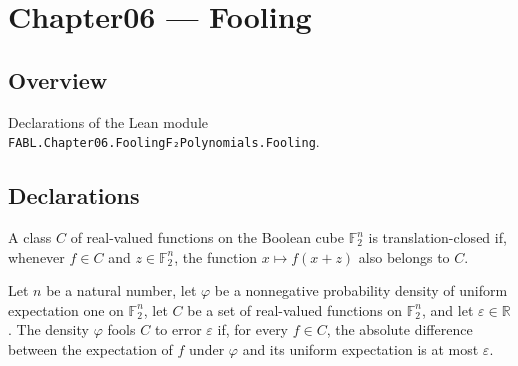 \chapter{Chapter06 — Fooling}
\section{Overview}

Declarations of the Lean module \texttt{FABL.Chapter06.FoolingF₂Polynomials.Fooling}.

\section{Declarations}

\begin{definition}
\label{FABL.IsTranslationClosed}
\leanok
A class $C$ of real-valued functions on the Boolean cube $\mathbb{F}_2^n$ is translation-closed if,
whenever $f \in C$ and $z \in \mathbb{F}_2^n$, the function $x \mapsto f(x+z)$ also belongs to $C$.
\end{definition}

\begin{definition}
\label{FABL.ProbabilityDensity.Fools}
\leanok
{}
Let $n$ be a natural number, let $\varphi$ be a nonnegative probability density of
uniform expectation one on $\mathbb{F}_2^n$, let $C$ be a set of real-valued functions
on $\mathbb{F}_2^n$, and let $\varepsilon\in\mathbb{R}$. The density $\varphi$ fools $C$
to error $\varepsilon$ if, for every $f\in C$, the absolute difference between the
expectation of $f$ under $\varphi$ and its uniform expectation is at most $\varepsilon$.
\end{definition}

